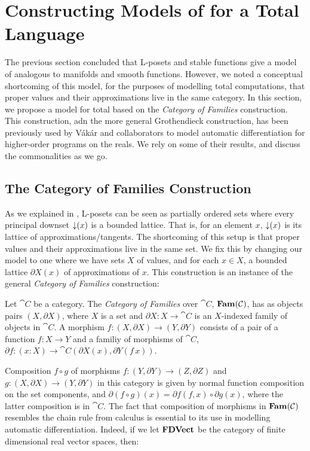 \section{Constructing Models of \GPS for a Total Language}
\label{sec:models-of-total-gps}

The previous section concluded that L-posets and stable functions give
a model of \GPS analogous to manifolds and smooth functions. However,
we noted a conceptual shortcoming of this model, for the purposes of
modelling total computations, that proper values and their
approximations live in the same category. In this section, we propose
a model for total \GPS based on the \emph{Category of Families}
construction. This construction, adn the more general Grothendieck
construction, has been previously used by V{\'a}k{\'a}r and
collaborators  to model automatic differentiation for
higher-order programs on the reals. We rely on some of their results,
and discuss the commonalities as we go.

\subsection{The Category of Families Construction}

As we explained in , L-posets can be seen as partially
ordered sets where every principal downset $\mathop{\downarrow}(x)$ is a bounded
lattice. That is, for an element $x$, $\mathop{\downarrow}(x)$ is its lattice of
approximations/tangents. The shortcoming of this setup is that proper
values and their approximations live in the same set. We fix this by
changing our model to one where we have sets $X$ of values, and for
each $x \in X$, a bounded lattice $\partial X(x)$ of approximations of
$x$. This construction is an instance of the general \emph{Category of
  Families} construction:

\begin{definition}
  Let $\cat{C}$ be a category. The \emph{Category of Families} over
  $\cat{C}$, $\mathbf{Fam}(\mathcal{C})$, has as objects pairs $(X, \partial X)$,
  where $X$ is a set and $\partial X : X \to \cat{C}$ is an
  $X$-indexed family of objects in $\cat{C}$. A morphism
  $f : (X, \partial X) \to (Y, \partial Y)$ consists of a pair of a
  function $f : X \to Y$ and a familiy of morphisms of $\cat{C}$,
  $\partial f : (x : X) \to \cat{C}(\partial X(x), \partial Y(f\,x))$.
\end{definition}

Composition $f \circ g $ of morphisms
$f : (Y, \partial Y) \to (Z, \partial Z)$ and
$g : (X, \partial X) \to (Y, \partial Y)$ in this category is given by
normal function composition on the set components, and
$\partial (f \circ g)(x) = \partial f(f, x) \circ \partial g(x)$,
where the latter composition is in $\cat{C}$. The fact that
composition of morphisms in $\mathbf{Fam}(\mathcal{C})$ resembles the chain rule
from calculus is essential to its use in modelling automatic
differentiation. Indeed, if we let $\mathbf{FDVect}$ be the category of
finite dimensional real vector spaces, then:

